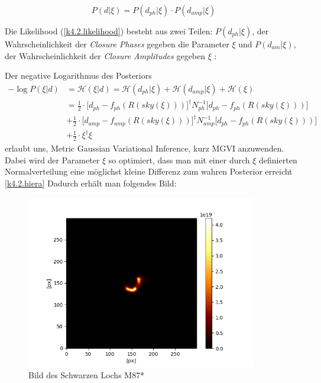 \begin{equation}
P(d|\xi)=  {P(d_{ph}|\xi)\cdot P(d_{amp}|\xi)}    
\end{equation}

Die Likelihood (\cref{k4.2.likelihood}) besteht aus zwei Teilen: $P(d_{ph}|\xi)$, der Wahrscheinlichkeit der \emph{Closure Phases} gegeben die Parameter $\xi$ und $P(d_{am}| \xi)$, der Wahrscheinlichkeit der \emph{Closure Amplitudes} gegeben $\xi$ : 

Der negative Logarithmus des Posteriors
\begin{align} \label{k4.2.Posterior}
 -\log {P(\xi|d)} &= 
 \mathcal{H} (\xi|d) = \mathcal{H} (d_{ph}|\xi)+\mathcal{H} (d_{amp}|\xi)+\mathcal{H} (\xi) \\
&= \frac {1}{2}\cdot \Bigg[d_{ph} - f_{ph}(R(sky(\xi))) \Bigg]^\dagger N^{-1}_{ph} \Bigg[d_{ph} - f_{ph}(R(sky(\xi))) \Bigg] 
\\  & + \frac {1}{2}\cdot \Bigg[d_{amp} - f_{amp}(R(sky(\xi))) \Bigg]^\dagger N_{amp}^{-1}\Bigg[d_{ph} - f_{ph}(R(sky(\xi))) \Bigg] \nonumber
\\ & +  \frac {1}{2} \cdot \xi^\dagger \xi \nonumber  
\end{align} 
 erlaubt uns, Metric Gaussian Variational Inference, kurz MGVI \parencite{k4.2.mgvi} anzuwenden. Dabei wird der Parameter $\xi$ so optimiert, dass man mit einer durch $\xi$ definierten Normalverteilung eine möglichst kleine Differenz zum wahren Posterior erreicht \cref{k4.2.hiera}
Dadurch erhält man folgendes Bild:

\begin{figure}
    \centering
    \includegraphics[width = 0.9\textwidth]{k4.2/black-hole-lin.png}
    \caption{Bild des Schwarzen Lochs M87*}
    \label{k4.2.black-hole-lin}
\end{figure}

